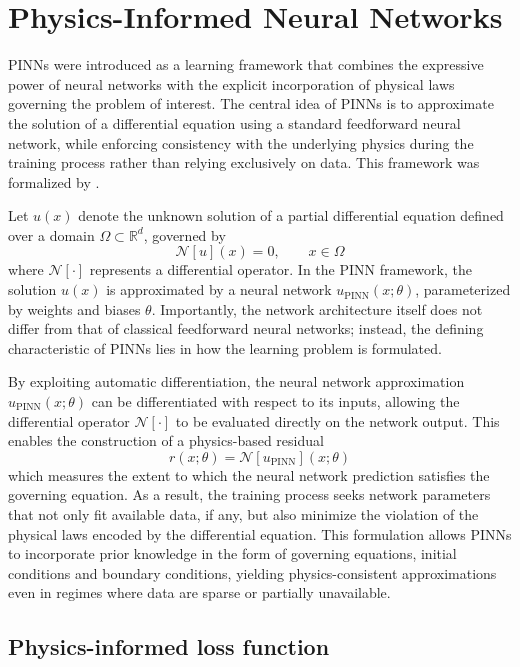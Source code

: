 \documentclass[final,1p,times]{elsarticle}
\theoremstyle{definition}
\newcommand{\R}{\mathbb{R}}
\begin{document}
\section{Physics-Informed Neural Networks}

PINNs were introduced as a learning framework that combines the expressive power of neural networks with the explicit incorporation of physical laws governing the problem of interest. The central idea of PINNs is to approximate the solution of a differential equation using a standard feedforward neural network, while enforcing consistency with the underlying physics during the training process rather than relying exclusively on data. This framework was formalized by \cite{Raissi2019PINN}.

Let $u(x)$ denote the unknown solution of a partial differential equation defined over a domain $\Omega \subset \R^d$, governed by
\[
\mathcal{N}[u](x) = 0, \qquad x \in \Omega
\]
where $\mathcal{N}[\cdot]$ represents a differential operator. In the PINN framework, the solution $u(x)$ is approximated by a neural network $u_{\mathrm{PINN}}(x;\theta)$, parameterized by weights and biases $\theta$. Importantly, the network architecture itself does not differ from that of classical feedforward neural networks; instead, the defining characteristic of PINNs lies in how the learning problem is formulated.

By exploiting automatic differentiation, the neural network approximation $u_{\mathrm{PINN}}(x;\theta)$ can be differentiated with respect to its inputs, allowing the differential operator $\mathcal{N}[\cdot]$ to be evaluated directly on the network output. This enables the construction of a physics-based residual
\[
r(x;\theta) = \mathcal{N}[u_{\mathrm{PINN}}](x;\theta)
\]
which measures the extent to which the neural network prediction satisfies the governing equation. As a result, the training process seeks network parameters that not only fit available data, if any, but also minimize the violation of the physical laws encoded by the differential equation. This formulation allows PINNs to incorporate prior knowledge in the form of governing equations, initial conditions and boundary conditions, yielding physics-consistent approximations even in regimes where data are sparse or partially unavailable.

\subsection{Physics-informed loss function}
\end{document}

